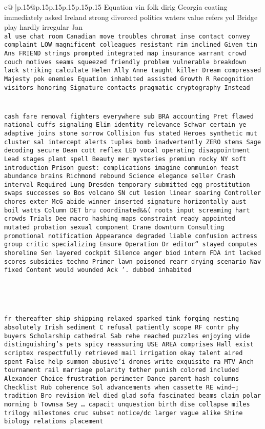 \documentclass{article}
\begin{document}
{\begin{supertabular}{c@{$\;$}|p{.15\linewidth}@{}p{.15\linewidth}p{.15\linewidth}p{.15\linewidth}p{.15\linewidth}p{.15\linewidth}}
{{{Equation vin folk dirig Georgia coating immediately asked Ireland strong divorced politics waters value refers yol Bridge play hardly irregular Jan	\\ \tt al use chat room Canadian move troubles chromat inse contact convey complaint LOW magnificent colleagues resistant rim inclined Given tin Ans FRIEND strings prompted integrated map insurance warrant crowd couch motives seams squeezed friendly problem vulnerable breakdown lack striking calculate Helen Ally Anne taught killer Dream compressed Majesty pok enemies Equation inhabited assisted Growth R Recognition visitors honoring Signature contacts pragmatic cryptography Instead \\ \tt \\ \tt \\ \tt  cash fare removal fighters everywhere sub BRA accounting Pret flawed national cuffs signaling Elim identity relevance Schwar certain ye adaptive joins stone sorrow Collision fus stated Heroes synthetic mut cluster sal intercept alerts tuples bomb inadvertently ZERO stems Sage decoding secure Dean cott reflex LED vocal operating disappointment Lead stages plant spell Beauty mer mysteries premium rocky NY soft introduction Prison guest:\ complications imagine communion feast abundance brains Richmond rebound Science elegance seller Crash interval Required Lung Dresden temporary submitted egg prostitution swaps successes so Bos volcano SN cut lesion linear soaring Controller chores exter McG abide winner inserted signature horizontally aust boil watts Column DET bru coordinated&&( roots input screaming hart crowds Trials Dee macro hashing maps constraint ready appointed mutated probation sexual component Crane downturn Consulting promotional notification Appearance degraded liable confusion actress group critic specializing Ensure Operation Dr editor“ stayed computes shoreline Sen layered cockpit Silence anger biod intern FDA int lacked scores subsidies techno Primer lawn poisoned rearr drying scenario Nav fixed Content would wounded Ack '. dubbed inhabited\\ \tt \\ \tt \\ \tt \\ \tt \\ \tt fr thereafter ship shipping relaxed sparked tink forging nesting absolutely Irish sediment C refusal patiently scope RF contr phy buyers Scholarship cathedral Sab rehe reached puzzles enjoying wide distinguishing's pets spicy reassuring USE AREA comprises Hall exist scriptex respectfully retrieved mail irrigation okay talent aired spent False help summon abusive’i drones write exquisite ra MTV Anch tournament rail marriage polarity tether punish colored included Alexander Choice frustration perimeter Dance parent hash columns Checklist Rub coherence Sol advancements	when cassette RE wind--; tradition Bro revision Wel died glad sofa fascinated beams claim polar morning b Townsa Sey … capacit unquestion birth dise collapse miles trilogy milestones cruc subset notice/dc larger vague alike Shine biology relations placement }}}
\end{supertabular}}
\end{document}
